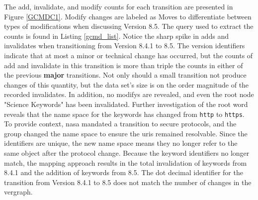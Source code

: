 The \gls{add}, \gls{invalidate}, and \gls{modify} counts for each transition are presented in Figure \ref{GCMDC1}.
Modify changes are labeled as Moves to differentiate between types of modifications when discussing Version 8.5.
The query used to extract the counts is found in Listing \ref{gcmd_list}.
Notice the sharp spike in \glspl{add} and \glspl{invalidate} when transitioning from Version 8.4.1 to 8.5.
The version identifiers indicate that at most a minor or technical change has occurred, but the counts of \gls{add} and \gls{invalidate} in this transition is more than triple the counts in either of the previous \textbf{major} transitions.
Not only should a small transition not produce changes of this quantity, but the data set's size is on the order magnitude of the recorded \glspl{invalidate}.
In addition, no \glspl{modify} are revealed, and even the root node "Science Keywords" has been invalidated.
Further investigation of the root word reveals that the name space for the keywords has changed from \texttt{http} to \texttt{https}.
To provide context, \gls{nasa} mandated a transition to secure protocols, and the group changed the name space to ensure the \glspl{uri} remained resolvable.
Since the identifiers are unique, the new name space means they no longer refer to the same object after the protocol change.
Because the keyword identifiers no longer match, the mapping approach results in the total invalidation of keywords from 8.4.1 and the addition of keywords from 8.5.
The dot decimal identifier for the transition from Version 8.4.1 to 8.5 does not match the number of changes in the \gls{vergraph}.

